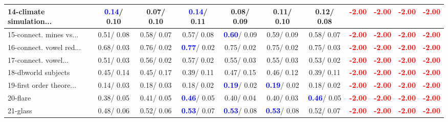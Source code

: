 \begin{table}[h]
\begin{center}
{\begin{tabular}{lc|c|c|c|c|c|c|c|c|c}
14-climate simulation... & \textcolor{blue}{\textbf{  0.14}}/  0.10 &   0.07/  0.10 & \textcolor{blue}{\textbf{  0.14}}/  0.11 &   0.08/  0.09 &   0.11/  0.10 &   0.12/  0.08 & \textcolor{red}{\textbf{ -2.00}} & \textcolor{red}{\textbf{ -2.00}} & \textcolor{red}{\textbf{ -2.00}} & \textcolor{red}{\textbf{ -2.00}} \\ \hline
15-connect. mines vs... &   0.51/  0.08 &   0.58/  0.07 &   0.57/  0.08 & \textcolor{blue}{\textbf{  0.60}}/  0.09 &   0.59/  0.09 &   0.58/  0.07 & \textcolor{red}{\textbf{ -2.00}} & \textcolor{red}{\textbf{ -2.00}} & \textcolor{red}{\textbf{ -2.00}} & \textcolor{red}{\textbf{ -2.00}} \\
16-connect. vowel red... &   0.68/  0.03 &   0.76/  0.02 & \textcolor{blue}{\textbf{  0.77}}/  0.02 &   0.75/  0.02 &   0.75/  0.02 &   0.75/  0.03 & \textcolor{red}{\textbf{ -2.00}} & \textcolor{red}{\textbf{ -2.00}} & \textcolor{red}{\textbf{ -2.00}} & \textcolor{red}{\textbf{ -2.00}} \\
17-connect. vowel... &   0.51/  0.03 &   0.56/  0.02 &   0.57/  0.02 &   0.55/  0.03 &   0.55/  0.03 &   0.53/  0.02 & \textcolor{red}{\textbf{ -2.00}} & \textcolor{red}{\textbf{ -2.00}} & \textcolor{red}{\textbf{ -2.00}} & \textcolor{red}{\textbf{ -2.00}} \\
18-dbworld subjects &   0.45/  0.14 &   0.45/  0.17 &   0.39/  0.11 &   0.47/  0.15 &   0.46/  0.12 &   0.39/  0.11 & \textcolor{red}{\textbf{ -2.00}} & \textcolor{red}{\textbf{ -2.00}} & \textcolor{red}{\textbf{ -2.00}} & \textcolor{red}{\textbf{ -2.00}} \\
19-first order theore... &   0.14/  0.03 &   0.18/  0.03 &   0.18/  0.02 & \textcolor{blue}{\textbf{  0.19}}/  0.02 & \textcolor{blue}{\textbf{  0.19}}/  0.02 &   0.18/  0.02 & \textcolor{red}{\textbf{ -2.00}} & \textcolor{red}{\textbf{ -2.00}} & \textcolor{red}{\textbf{ -2.00}} & \textcolor{red}{\textbf{ -2.00}} \\
20-flare &   0.38/  0.05 &   0.41/  0.05 & \textcolor{blue}{\textbf{  0.46}}/  0.05 &   0.40/  0.04 &   0.40/  0.03 & \textcolor{blue}{\textbf{  0.46}}/  0.05 & \textcolor{red}{\textbf{ -2.00}} & \textcolor{red}{\textbf{ -2.00}} & \textcolor{red}{\textbf{ -2.00}} & \textcolor{red}{\textbf{ -2.00}} \\
21-glass &   0.48/  0.06 &   0.52/  0.06 & \textcolor{blue}{\textbf{  0.53}}/  0.07 & \textcolor{blue}{\textbf{  0.53}}/  0.08 & \textcolor{blue}{\textbf{  0.53}}/  0.08 &   0.52/  0.07 & \textcolor{red}{\textbf{ -2.00}} & \textcolor{red}{\textbf{ -2.00}} & \textcolor{red}{\textbf{ -2.00}} & \textcolor{red}{\textbf{ -2.00}} \\ \hline

\end{tabular}}
\end{center}
\end{table}
